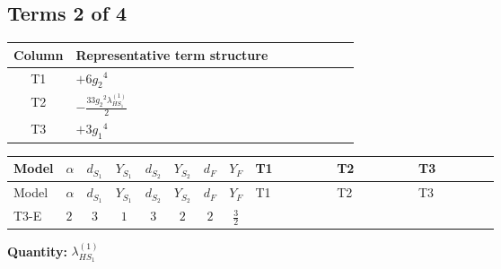 \documentclass[8pt]{article}
\begin{document}
\begin{landscape}
\subsection*{Terms 2 of 4}
\begin{center}
\begin{tabular}{@{}c >{\raggedright\arraybackslash}p{0.82\linewidth}@{}}
\toprule
Column & Representative term structure \\
\midrule
T1 & \(\displaystyle +6 {g_2}^4\) \\
\midrule
T2 & \(\displaystyle -\frac{33 {g_2}^2 {\lambda_{HS_1}^{(1)}}}{2}\) \\
\midrule
T3 & \(\displaystyle +3 {g_1}^4\) \\
\midrule
\bottomrule
\end{tabular}
\end{center}
\smallskip
\tiny
\begin{longtable}{@{}llcccccc >{\raggedright\arraybackslash}p{0.21\linewidth} >{\raggedright\arraybackslash}p{0.21\linewidth} >{\raggedright\arraybackslash}p{0.21\linewidth}@{}}
\toprule
Model & $\alpha$ & $d_{S_1}$ & $Y_{S_1}$ & $d_{S_2}$ & $Y_{S_2}$ & $d_F$ & $Y_F$ & T1 & T2 & T3 \\
\midrule
\endfirsthead
\toprule
Model & $\alpha$ & $d_{S_1}$ & $Y_{S_1}$ & $d_{S_2}$ & $Y_{S_2}$ & $d_F$ & $Y_F$ & T1 & T2 & T3 \\
\midrule
\endhead
T3-E & $2$ & $3$ & $1$ & $3$ & $2$ & $2$ & $\frac{3}{2}$ & \scriptsize\adjustbox{max width=\linewidth}{$\begin{gathered} +6 {g_2}^4\end{gathered}$} & \scriptsize\adjustbox{max width=\linewidth}{$\begin{gathered} -\frac{33 {g_2}^2 {\lambda_{HS_1}^{(1)}}}{2}\end{gathered}$} & \scriptsize\adjustbox{max width=\linewidth}{$\begin{gathered} +3 {g_1}^4\end{gathered}$} \\
\midrule
\bottomrule
\end{longtable}
\clearpage
\noindent\textbf{Quantity: }$\lambda_{HS_1}^{(1)}$\par\smallskip

\end{landscape}
\end{document}
